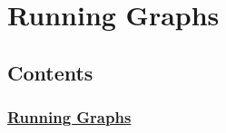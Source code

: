 

\section{Running Graphs }\label{running-graphs}

\subsection{Contents}\label{contents}

\subsubsection{\texorpdfstring{\protect\hyperlink{AUTOGENERATED-running-graphs}{Running
Graphs}}{Running Graphs}}\label{running-graphs-1}

